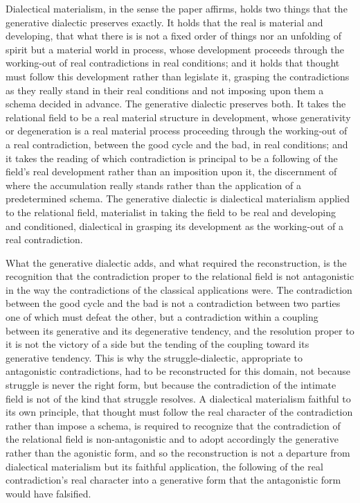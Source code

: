 Dialectical materialism, in the sense the paper affirms, holds two things that the generative dialectic preserves exactly. It holds that the real is material and developing, that what there is is not a fixed order of things nor an unfolding of spirit but a material world in process, whose development proceeds through the working-out of real contradictions in real conditions; and it holds that thought must follow this development rather than legislate it, grasping the contradictions as they really stand in their real conditions and not imposing upon them a schema decided in advance. The generative dialectic preserves both. It takes the relational field to be a real material structure in development, whose generativity or degeneration is a real material process proceeding through the working-out of a real contradiction, between the good cycle and the bad, in real conditions; and it takes the reading of which contradiction is principal to be a following of the field's real development rather than an imposition upon it, the discernment of where the accumulation really stands rather than the application of a predetermined schema. The generative dialectic is dialectical materialism applied to the relational field, materialist in taking the field to be real and developing and conditioned, dialectical in grasping its development as the working-out of a real contradiction.

What the generative dialectic adds, and what required the reconstruction, is the recognition that the contradiction proper to the relational field is not antagonistic in the way the contradictions of the classical applications were. The contradiction between the good cycle and the bad is not a contradiction between two parties one of which must defeat the other, but a contradiction within a coupling between its generative and its degenerative tendency, and the resolution proper to it is not the victory of a side but the tending of the coupling toward its generative tendency. This is why the struggle-dialectic, appropriate to antagonistic contradictions, had to be reconstructed for this domain, not because struggle is never the right form, but because the contradiction of the intimate field is not of the kind that struggle resolves. A dialectical materialism faithful to its own principle, that thought must follow the real character of the contradiction rather than impose a schema, is required to recognize that the contradiction of the relational field is non-antagonistic and to adopt accordingly the generative rather than the agonistic form, and so the reconstruction is not a departure from dialectical materialism but its faithful application, the following of the real contradiction's real character into a generative form that the antagonistic form would have falsified.

